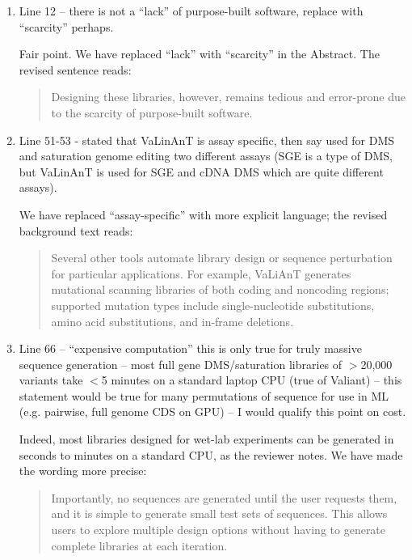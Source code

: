 \documentclass[11pt]{article}
\newenvironment{response}{\par\color{responseblue}}{\par}
\newenvironment{msquote}
  {\begin{quote}\color{quotedtext}\noindent\ignorespaces}
  {\end{quote}}
\begin{document}
\begin{enumerate}
\item Line 12 -- there is not a ``lack'' of purpose-built software, replace
with ``scarcity'' perhaps.

\begin{response}
Fair point. We have replaced ``lack'' with ``scarcity'' in the Abstract. The revised sentence reads:

\begin{msquote}
Designing these libraries, however, remains tedious and error-prone due to the scarcity of purpose-built software.
\end{msquote}
\end{response}

\item Line 51-53 - stated that VaLinAnT is assay specific, then say used for DMS
and saturation genome editing two different assays (SGE is a type of DMS, but
VaLinAnT is used for SGE and cDNA DMS which are quite different assays).

\begin{response}
We have replaced ``assay-specific'' with more explicit language; the revised background text reads:

\begin{msquote}
Several other tools automate library design or sequence perturbation for particular applications. For example, VaLiAnT \citep{Barbon2022th} generates mutational scanning libraries of both coding and noncoding regions; supported mutation types include single-nucleotide substitutions, amino acid substitutions, and in-frame deletions.
\end{msquote}
\end{response}

\item Line 66 -- ``expensive computation'' this is only true for truly massive
sequence generation -- most full gene DMS/saturation libraries of $>$20,000
variants take $<$5 minutes on a standard laptop CPU (true of Valiant) -- this
statement would be true for many permutations of sequence for use in ML (e.g.
pairwise, full genome CDS on GPU) -- I would qualify this point on cost.

\begin{response}
Indeed, most libraries designed for wet-lab experiments can be generated in seconds to minutes on a standard CPU, as the reviewer notes. We have made the wording more precise:

\begin{msquote}
Importantly, no sequences are generated until the user requests them, and it is simple to generate small test sets of sequences. This allows users to explore multiple design options without having to generate complete libraries at each iteration.
\end{msquote}
\end{response}


\end{enumerate}
\end{document}
